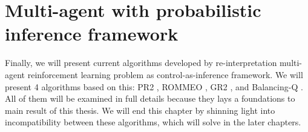 \section{Multi-agent with probabilistic inference framework}
Finally, we will present current algorithms developed by re-interpretation multi-agent reinforcement learning problem as control-as-inference framework. We will present 4 algorithms based on this: PR2 \cite{wen2019probabilistic}, ROMMEO \cite{tian2019regularized}, GR2 \cite{wen2019multi}, and Balancing-Q \cite{grau2018balancing}. All of them will be examined in full details because they lays a foundations to main result of this thesis. We will end this chapter by shinning light into incompatibility between these algorithms, which will solve in the later chapters. 